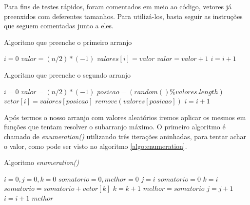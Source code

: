 \documentclass[
	12pt,				%
	oneside,   	        %
	a4paper,			%
	english,			%
	french,				%
	spanish,			%
	brazil,				%
	]{pacotes/abntex2}
\begin{document}
Para fins de testes rápidos, foram comentados em meio ao código, vetores já preenxidos com deferentes tamanhos. Para utilizá-los, basta seguir as instruções que seguem comentadas junto a eles.

\begin{algorithm}
\caption{Algoritmo que preenche o primeiro arranjo}
\label{algo:preencheprimeiroarranjo}
\begin{algorithmic}[1]
        \State  $i = 0$
        \State  $valor = (n / 2) * (-1)$
            \State $valores[i] = valor$ 
            \State $valor = valor + 1$
            \State $i = i + 1$
        \EndWhile
        \State \Return
    \EndFunction
\end{algorithmic}
\end{algorithm}

\begin{algorithm}
\caption{Algoritmo que preenche o segundo arranjo}
\label{algo:preenchesegundoarranjo}
\begin{algorithmic}[1]
        \State  $i = 0$
        \State  $valor = (n / 2) * (-1)$
            \State $posicao = (random()\%valores.length)$
            \State $vetor[i] = valores[posicao]$
            \State $remove(valores[posicao])$
            \State $i = i + 1$
        \EndWhile
        \State \Return
    \EndFunction
\end{algorithmic}
\end{algorithm}

Após termos o nosso arranjo com valores aleatórios iremos aplicar os mesmos em funções que tentam resolver o subarranjo máximo. O primeiro algoritmo é chamado de \textit{enumeration()} utilizando três iterações aninhadas, para tentar achar o valor, como pode ser visto no algoritmo  \ref{algo:enumeration}. 

\begin{algorithm}[!htb]
\caption{Algoritmo \textit{enumeration()}}
\label{algo:enumeration}
\begin{algorithmic}[1]
        \State  $i = 0, j = 0, k = 0$
        \State  $somatorio = 0, melhor = 0$
            \State $j = i$
                \State $somatorio = 0$
                \State $k = i$
                    \State $somatorio = somatorio + vetor[k]$ 
                    \State $k = k + 1$
                \EndWhile
                    \State  $melhor = somatorio$
                \EndIf
                \State $j = j + 1$
            \EndWhile
            \State $i = i + 1$
        \EndWhile
        \State \Return $melhor$
    \EndFunction
\end{algorithmic}
\end{algorithm}
\end{document}
